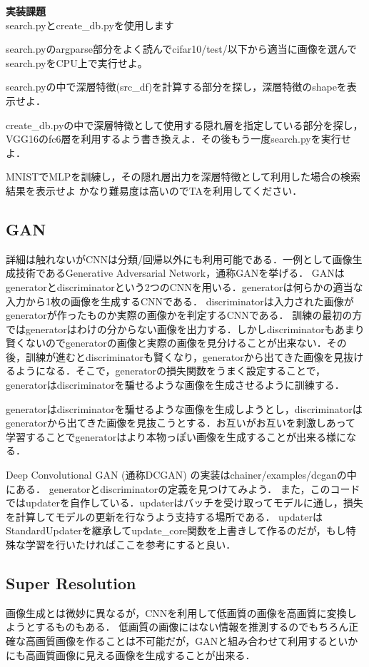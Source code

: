 {\bf 実装課題}\\
search.pyとcreate\_db.pyを使用します
   \begin{practice}
    search.pyのargparse部分をよく読んでcifar10/test/以下から適当に画像を選んでsearch.pyをCPU上で実行せよ。
   \end{practice}
   \begin{practice}
   search.pyの中で深層特徴(src\_df)を計算する部分を探し，深層特徴のshapeを表示せよ．
   \end{practice}
   \begin{practice}
    create\_db.pyの中で深層特徴として使用する隠れ層を指定している部分を探し，VGG16のfc6層を利用するよう書き換えよ．その後もう一度search.pyを実行せよ．
   \end{practice}
   \begin{practice}
    MNISTでMLPを訓練し，その隠れ層出力を深層特徴として利用した場合の検索結果を表示せよ
    かなり難易度は高いのでTAを利用してください．
   \end{practice}


\subsection{GAN}
詳細は触れないがCNNは分類/回帰以外にも利用可能である．一例として画像生成技術であるGenerative Adversarial Network，通称GANを挙げる．
GANはgeneratorとdiscriminatorという2つのCNNを用いる．generatorは何らかの適当な入力から1枚の画像を生成するCNNである．
discriminatorは入力された画像がgeneratorが作ったものか実際の画像かを判定するCNNである．
訓練の最初の方ではgeneratorはわけの分からない画像を出力する．しかしdiscriminatorもあまり賢くないのでgeneratorの画像と実際の画像を見分けることが出来ない．その後，訓練が進むとdiscriminatorも賢くなり，generatorから出てきた画像を見抜けるようになる．そこで，generatorの損失関数をうまく設定することで，generatorはdiscriminatorを騙せるような画像を生成させるように訓練する．

generatorはdiscriminatorを騙せるような画像を生成しようとし，discriminatorはgeneratorから出てきた画像を見抜こうとする．お互いがお互いを刺激しあって学習することでgeneratorはより本物っぽい画像を生成することが出来る様になる．

Deep Convolutional GAN (通称DCGAN) の実装はchainer/examples/dcganの中にある．
generatorとdiscriminatorの定義を見つけてみよう．
また，このコードではupdaterを自作している．updaterはバッチを受け取ってモデルに通し，損失を計算してモデルの更新を行なうよう支持する場所である．
updaterはStandardUpdaterを継承してupdate\_core関数を上書きして作るのだが，もし特殊な学習を行いたければここを参考にすると良い．

\subsection{Super Resolution}
画像生成とは微妙に異なるが，CNNを利用して低画質の画像を高画質に変換しようとするものもある．
低画質の画像にはない情報を推測するのでもちろん正確な高画質画像を作ることは不可能だが，GANと組み合わせて利用するといかにも高画質画像に見える画像を生成することが出来る．